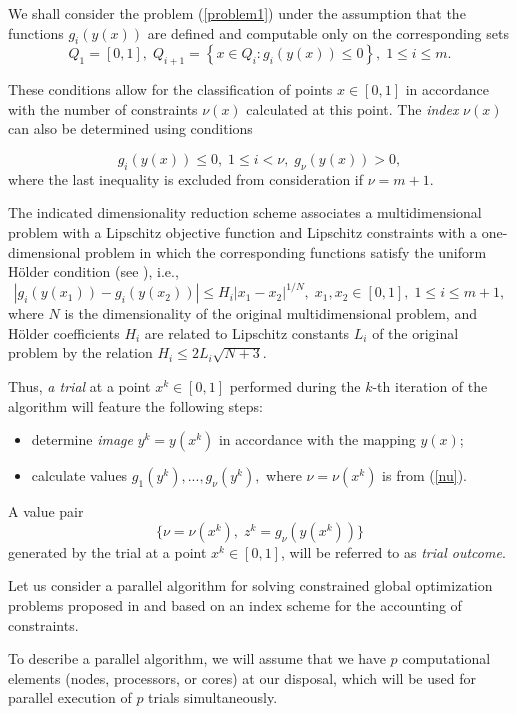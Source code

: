 \documentclass[
11pt,%
tightenlines,%
twoside,%
onecolumn,%
nofloats,%
nobibnotes,%
nofootinbib,%
superscriptaddress,%
noshowpacs,%
centertags]%
{revtex4}
\begin{document}
We shall consider the problem (\ref{problem1}) under the assumption that the functions $g_i(y(x))$ are defined and computable only on the corresponding sets
\[
Q_1=[0,1], \; Q_{i+1}=\left\{x \in Q_i : g_i(y(x)) \leq 0 \right\}, \; 1 \leq i \leq m.
\]

These conditions allow for the classification of points $x \in [0,1]$ in accordance with the number of constraints $\nu(x)$  calculated at this point. The \textit{index} $\nu(x)$ can also be determined using conditions

\begin{equation}\label{nu}
g_i(y(x)) \leq 0, \; 1 \leq i < \nu, \; g_\nu(y(x))>0,
\end{equation}
where the last inequality is excluded from consideration if  $\nu=m+1$.

The indicated dimensionality reduction scheme associates a multidimensional problem with a Lipschitz objective function and Lipschitz constraints with a one-dimensional problem in which the corresponding functions satisfy the uniform  H{\"o}lder condition (see \cite{Sergeyev2013}), i.e.,
\[
\left|g_i(y(x_1))-g_i (y(x_2))\right| \leq H_i \left|x_1-x_2 \right|^{1/N}, \; x_1,x_2\in [0,1], \; 1\leq i \leq m+1,
\]
where $N$ is the dimensionality of the original multidimensional problem, and H{\"o}lder coefficients $H_i$ are related to Lipschitz constants $L_i$ of the original problem by the relation  $H_i \leq 2L_i \sqrt{N+3}$.

Thus, \textit{a trial} at a point $x^k \in [0,1]$ performed during the $k$-th iteration of the algorithm will feature the following steps:
\begin{itemize}
	\item determine \textit{image} $y^k=y(x^k)$ in accordance with the mapping $y(x)$;
	\item calculate values $g_1(y^k),..., g_\nu(y^k),$ where $\nu = \nu(x^k)$ is from (\ref{nu}). 
\end{itemize}
A value pair
\begin{equation} \label{trial_result}
 \{ \nu=\nu(x^k), \; z^k=g_\nu(y(x^k)) \} 
\end{equation}
generated by the trial at a point $x^k \in [0,1]$, will be referred to as \textit{trial outcome}.

Let us consider a parallel algorithm for solving constrained global optimization problems proposed in  \cite{Strongin2000,Strongin2013} and based on an index scheme for the accounting of constraints.

To describe a parallel algorithm, we will assume that we have $p$ computational elements (nodes, processors, or cores) at our disposal, which will be used for parallel execution of $p$ trials simultaneously. 
\end{document}
